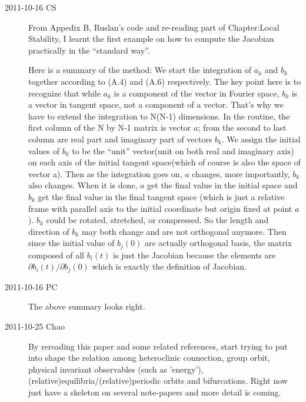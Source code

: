 \begin{description}
\item[2011-10-16 CS]
From Appedix B, Ruslan's code and re-reading part of Chapter:Local Stability,
I learnt the first example on how to compute the Jacobian practically in the
``standard way''.

Here is a summary of the method:
We start the integration of ${a_k}$ and ${b_k}$ together according to
(A.4) and (A.6) respectively. The key point here is to recognize that
while ${a_k}$ is a component of the vector in Fourier space, $b_k$ is a
vector in tangent space, not a component of a vector. That's why we have
to extend the integration to N(N-1) dimensions. In the routine, the first
column of the N by N-1 matrix is vector $a$; from the second to last
column are real part and imaginary part of vectors ${b_k}$. We assign the
initial values of ${b_k}$ to be the ``unit'' vector(unit on both real and
imaginary axis) on each axis of the initial tangent space(which of course
is also the space of vector a). Then as the integration goes on, $a$
changes, more importantly, ${b_k}$ also changes. When it is done, $a$ get
the final value in the initial space and ${b_k}$ get the final value in
the final tangent space (which is just a relative frame with parallel axis
to the initial coordinate but origin fixed at point $a$). ${b_k}$ could
be rotated, stretched, or compressed. So the length and direction of
${b_k}$ may both change and are not orthogonal anymore. Then since the
initial value of ${b_j(0)}$ are actually orthogonal basis, the matrix
composed of all ${b_i(t)}$ is just the Jacobian because the elements are
$\partial{b_i(t)}/\partial{b_j(0)}$ which is exactly the definition of
Jacobian.

\item[2011-10-16 PC] The above summary looks right.

\item[2011-10-25 Chao] By rereading this paper and some related
references, start trying to put into shape the relation among
heteroclinic connection, group orbit, physical invariant observables (such
as 'energy'), (relative)equilibria/(relative)periodic orbits and
bifurcations. Right now just have a skeleton on several note-papers and
more detail is coming.

\end{description}
